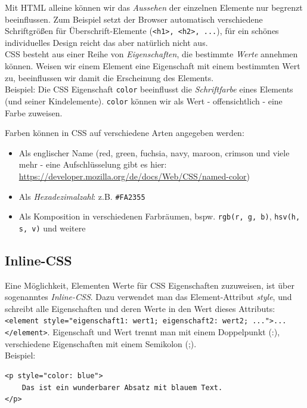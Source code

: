 \documentclass[ngerman,11pt]{article}
\begin{document}
    Mit HTML alleine können wir das \textit{Aussehen} der einzelnen Elemente nur begrenzt beeinflussen.
    Zum Beispiel setzt der Browser automatisch verschiedene Schriftgrößen für Überschrift-Elemente (\verb_<h1>, <h2>, ..._),
    für ein schönes individuelles Design reicht das aber natürlich nicht aus. \\

    CSS besteht aus einer Reihe von \textit{Eigenschaften}, die bestimmte \textit{Werte} annehmen können.
    Weisen wir einem Element eine Eigenschaft mit einem bestimmten Wert zu, beeinflussen wir damit die Erscheinung des Elements. \\

    Beispiel: Die CSS Eigenschaft \verb_color_ beeinflusst die \textit{Schriftfarbe} eines Elements (und seiner Kindelemente).
    \verb_color_ können wir als Wert - offensichtlich - eine Farbe zuweisen.

    Farben können in CSS auf verschiedene Arten angegeben werden:

    \begin{itemize}
        \item Als englischer Name (red, green, fuchsia, navy, maroon, crimson und viele mehr -
        eine Aufschlüsselung gibt es hier: \url{https://developer.mozilla.org/de/docs/Web/CSS/named-color})
        \item Als \textit{Hexadezimalzahl}: z.B. \verb_#FA2355_
        \item Als Komposition in verschiedenen Farbräumen, bspw. \verb_rgb(r, g, b)_, \verb_hsv(h, s, v)_ und weitere
    \end{itemize}

    \subsection{Inline-CSS}

    Eine Möglichkeit, Elementen Werte für CSS Eigenschaften zuzuweisen, ist über sogenanntes \textit{Inline-CSS}.
    Dazu verwendet man das Element-Attribut \textit{style}, und schreibt alle Eigenschaften und deren Werte in den Wert
    dieses Attributs: \verb_<element style="eigenschaft1: wert1; eigenschaft2: wert2; ...">...</element>_.
    Eigenschaft und Wert trennt man mit einem Doppelpunkt (:), verschiedene Eigenschaften mit einem Semikolon (;). \\

    Beispiel:

    \begin{lstlisting}[type=htmlcssjs]
<p style="color: blue">
    Das ist ein wunderbarer Absatz mit blauem Text.
</p>
    \end{lstlisting}
\end{document}
